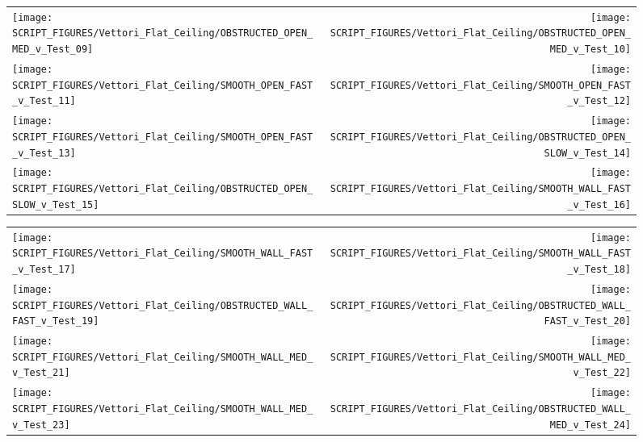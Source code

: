 \begin{figure}[p]
\begin{tabular*}{\textwidth}{l@{\extracolsep{\fill}}r}
\texttt{[image: SCRIPT\_FIGURES/Vettori\_Flat\_Ceiling/OBSTRUCTED\_OPEN\_MED\_v\_Test\_09]} &
\texttt{[image: SCRIPT\_FIGURES/Vettori\_Flat\_Ceiling/OBSTRUCTED\_OPEN\_MED\_v\_Test\_10]} \\
\texttt{[image: SCRIPT\_FIGURES/Vettori\_Flat\_Ceiling/SMOOTH\_OPEN\_FAST\_v\_Test\_11]} &
\texttt{[image: SCRIPT\_FIGURES/Vettori\_Flat\_Ceiling/SMOOTH\_OPEN\_FAST\_v\_Test\_12]} \\
\texttt{[image: SCRIPT\_FIGURES/Vettori\_Flat\_Ceiling/SMOOTH\_OPEN\_FAST\_v\_Test\_13]} &
\texttt{[image: SCRIPT\_FIGURES/Vettori\_Flat\_Ceiling/OBSTRUCTED\_OPEN\_SLOW\_v\_Test\_14]} \\
\texttt{[image: SCRIPT\_FIGURES/Vettori\_Flat\_Ceiling/OBSTRUCTED\_OPEN\_SLOW\_v\_Test\_15]} &
\texttt{[image: SCRIPT\_FIGURES/Vettori\_Flat\_Ceiling/SMOOTH\_WALL\_FAST\_v\_Test\_16]} \\
\end{tabular*}
\label{Vettori_2}
\end{figure}

\begin{figure}[p]
\begin{tabular*}{\textwidth}{l@{\extracolsep{\fill}}r}
\texttt{[image: SCRIPT\_FIGURES/Vettori\_Flat\_Ceiling/SMOOTH\_WALL\_FAST\_v\_Test\_17]} &
\texttt{[image: SCRIPT\_FIGURES/Vettori\_Flat\_Ceiling/SMOOTH\_WALL\_FAST\_v\_Test\_18]} \\
\texttt{[image: SCRIPT\_FIGURES/Vettori\_Flat\_Ceiling/OBSTRUCTED\_WALL\_FAST\_v\_Test\_19]} &
\texttt{[image: SCRIPT\_FIGURES/Vettori\_Flat\_Ceiling/OBSTRUCTED\_WALL\_FAST\_v\_Test\_20]} \\
\texttt{[image: SCRIPT\_FIGURES/Vettori\_Flat\_Ceiling/SMOOTH\_WALL\_MED\_v\_Test\_21]} &
\texttt{[image: SCRIPT\_FIGURES/Vettori\_Flat\_Ceiling/SMOOTH\_WALL\_MED\_v\_Test\_22]} \\
\texttt{[image: SCRIPT\_FIGURES/Vettori\_Flat\_Ceiling/SMOOTH\_WALL\_MED\_v\_Test\_23]} &
\texttt{[image: SCRIPT\_FIGURES/Vettori\_Flat\_Ceiling/OBSTRUCTED\_WALL\_MED\_v\_Test\_24]} \\
\end{tabular*}
\label{Vettori_3}
\end{figure}

